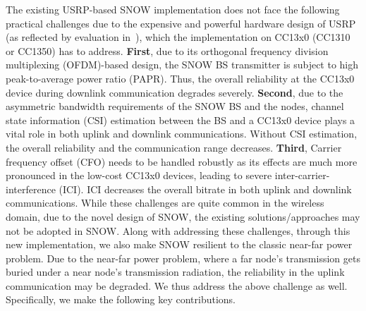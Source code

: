 
The existing USRP-based SNOW implementation does not face the following practical challenges due to the expensive and powerful hardware design of USRP (as reflected by evaluation in~\cite{snow_ton, snow, snow2}), which the implementation on CC13x0 (CC1310 or CC1350) has to address. 
{\bf First}, due to its orthogonal frequency division multiplexing (OFDM)-based design, the SNOW BS transmitter is subject to high peak-to-average power ratio (PAPR). Thus, the overall reliability at the CC13x0 device during downlink communication degrades severely. 
{\bf Second}, due to the asymmetric bandwidth requirements of the SNOW BS and the nodes, channel state information (CSI) estimation between the BS and a CC13x0 device plays a vital role in both uplink and downlink communications. Without CSI estimation, the overall reliability and the communication range decreases. 
{\bf Third}, Carrier frequency offset (CFO) needs to be handled robustly as its effects are much more pronounced in the low-cost CC13x0 devices, leading to severe inter-carrier-interference (ICI). ICI decreases the overall bitrate in both uplink and downlink communications. 
While these challenges are quite common in the wireless domain, due to the novel design of SNOW, the existing solutions/approaches may not be adopted in SNOW.
Along with addressing these challenges, through this new implementation, we also make SNOW resilient to the classic near-far power problem. Due to the near-far power problem, where a far node's transmission gets buried under a near node's transmission radiation, the reliability in the uplink communication may be degraded. We thus address the above challenge as well.
Specifically, we make the following key contributions.
